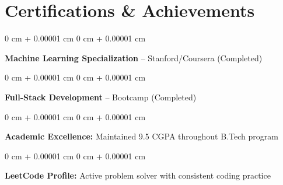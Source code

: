 \documentclass[11pt, letterpaper]{article}
\newenvironment{onecolentry}{
    \begin{adjustwidth}{
        0 cm + 0.00001 cm
    }{
        0 cm + 0.00001 cm
    }
}{
    \end{adjustwidth}
} %
\begin{document}
    \vspace{0.15 cm}

    \section{Certifications \& Achievements}

    \begin{onecolentry}
        \textbf{Machine Learning Specialization} -- Stanford/Coursera (Completed)
    \end{onecolentry}
    \vspace{0.05 cm}
    \begin{onecolentry}
        \textbf{Full-Stack Development} -- Bootcamp (Completed)
    \end{onecolentry}
    \vspace{0.05 cm}
    \begin{onecolentry}
        \textbf{Academic Excellence:} Maintained 9.5 CGPA throughout B.Tech program
    \end{onecolentry}
    \vspace{0.05 cm}
    \begin{onecolentry}
        \textbf{LeetCode Profile:} Active problem solver with consistent coding practice
    \end{onecolentry}
\end{document}
